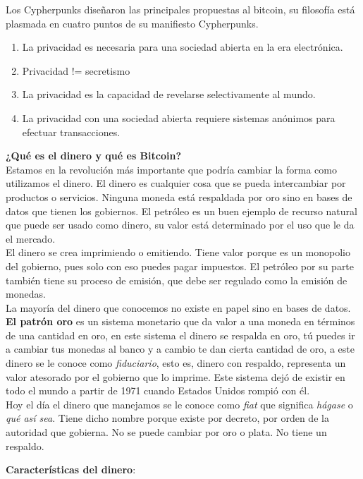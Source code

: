 \documentclass[a4paper,12pt]{/home/armando/Documentos/Cursos/LaTeX/Plantillas/lib/pub}
\begin{document}
Los Cypherpunks diseñaron las principales propuestas al bitcoin, su filosofía está plasmada en cuatro puntos de su manifiesto Cypherpunks.
\begin{enumerate}	
	\item  La privacidad es necesaria para una sociedad abierta en la era electrónica.
	\item  Privacidad != secretismo
	\item  La privacidad es la capacidad de revelarse selectivamente al mundo.
	\item  La privacidad con una sociedad abierta requiere sistemas anónimos para efectuar transacciones.
\end{enumerate}
\textbf{¿Qué es el dinero y qué es Bitcoin?}\\
Estamos en la revolución más importante que podría cambiar la forma como utilizamos el dinero.
El dinero es cualquier cosa que se pueda intercambiar por productos o servicios. Ninguna moneda está respaldada por oro sino en bases de datos que tienen los gobiernos. El petróleo es un buen ejemplo de recurso natural que puede ser usado como dinero, su valor está determinado por el uso que le da el mercado.\\
El dinero se crea imprimiendo o emitiendo. Tiene valor porque es un monopolio del gobierno, pues solo con eso puedes pagar impuestos. El petróleo por su parte también tiene su proceso de emisión, que debe ser regulado como la emisión de monedas.\\
La mayoría del dinero que conocemos no existe en papel sino en bases de datos.\\

\textbf{El patrón oro} es un sistema monetario que da valor a una moneda en términos de una cantidad en oro, en este sistema el dinero se respalda en oro, tú puedes ir a cambiar tus monedas al banco y a cambio te dan cierta cantidad de oro, a este dinero se le conoce como \textit{fiduciario}, esto es, dinero con respaldo, representa un valor atesorado por el gobierno que lo imprime. Este sistema dejó de existir en todo el mundo a partir de 1971 cuando Estados Unidos rompió con él.\\

Hoy el día el dinero que manejamos se le conoce como \textit{fiat} que significa \textit{hágase} o \textit{qué así sea}. Tiene dicho nombre porque existe por decreto, por orden de la autoridad que gobierna. No se puede cambiar por oro o plata. No tiene un respaldo.

\textbf{Características del dinero}:
\end{document}
